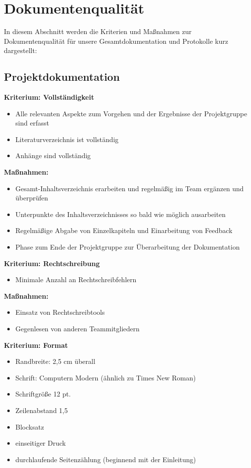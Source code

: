 \section{Dokumentenqualität}
In diesem Abschnitt werden die Kriterien und Maßnahmen zur Dokumentenqualität für unsere Gesamtdokumentation und Protokolle kurz dargestellt:
\\
\subsection{Projektdokumentation}
\textbf{Kriterium: Vollständigkeit}
\begin{itemize}
\item	Alle relevanten Aspekte zum Vorgehen und der Ergebnisse der Projektgruppe sind erfasst
\item	Literaturverzeichnis ist vollständig
\item	Anhänge sind vollständig
\end{itemize}

\textbf{Maßnahmen: }
\begin{itemize}
\item	Gesamt-Inhaltsverzeichnis erarbeiten und regelmäßig im Team ergänzen und überprüfen
\item	Unterpunkte des Inhaltsverzeichnisses so bald wie möglich ausarbeiten 
\item	Regelmäßige Abgabe von Einzelkapiteln und Einarbeitung von Feedback
\item	Phase zum Ende der Projektgruppe zur Überarbeitung der Dokumentation
\end{itemize}

\textbf{Kriterium: Rechtschreibung}
\begin{itemize}
\item	Minimale Anzahl an Rechtschreibfehlern
\end{itemize}

\textbf{Maßnahmen: }
\begin{itemize}
\item	Einsatz von Rechtschreibtools
\item	Gegenlesen von anderen Teammitgliedern
\end{itemize}

\textbf{Kriterium: Format}
\begin{itemize}
\item	Randbreite: 2,5 cm überall
\item	Schrift: Computern Modern (ähnlich zu Times New Roman)
\item	Schriftgröße 12 pt.
\item	Zeilenabstand 1,5
\item	Blocksatz
\item	einseitiger Druck
\item	durchlaufende Seitenzählung (beginnend mit der Einleitung)
\end{itemize}

